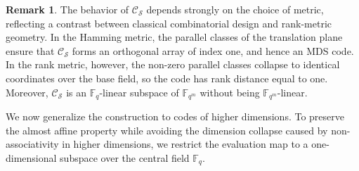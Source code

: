 \documentclass[a4paper,11pt,reqno]{article}
\theoremstyle{plain} \numberwithin{equation}{section}
\theoremstyle{definition}
\newtheorem{remark}[theorem]{Remark}
\begin{document}
\begin{remark}
The behavior of $\mathcal{C}_{\mathcal{S}}$ depends strongly on the choice of metric, reflecting a contrast between classical combinatorial design and rank-metric geometry. In the Hamming metric, the parallel classes of the translation plane ensure that $\mathcal{C}_{\mathcal{S}}$ forms an orthogonal array of index one, and hence an MDS code. In the rank metric, however, the non-zero parallel classes collapse to identical coordinates over the base field, so the code has rank distance equal to one. Moreover, $\mathcal{C}_{\mathcal{S}}$ is an $\mathbb{F}_q$-linear subspace of $\mathbb{F}_{q^m}$ without being $\mathbb{F}_{q^m}$-linear.
\end{remark}

We now generalize the construction to codes of higher dimensions. To preserve the almost affine property while avoiding the dimension collapse caused by non-associativity in higher dimensions, we restrict the evaluation map to a one-dimensional subspace over the central field $\mathbb{F}_q$.
\end{document}
